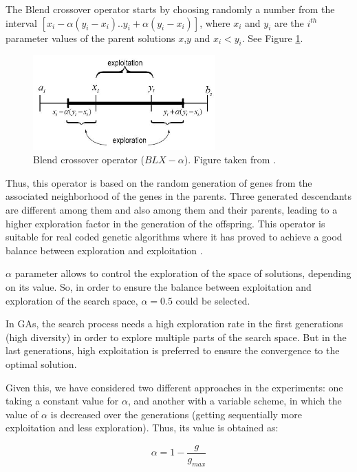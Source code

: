 \documentclass[10pt,journal,compsoc]{IEEEtran}
\begin{document}
The Blend crossover operator starts by choosing randomly a number from the interval $[x_i-\alpha(y_i-x_i).. y_i+\alpha(y_i-x_i)]$, where $x_i$ and $y_i$ are the $i^{th}$ parameter values of the parent solutions $x$,$y$ and $x_i < y_i$. See Figure \ref{fig:blxalpha}.

 \begin{figure}[!ht]	
 	\begin{center}
 		\includegraphics[width=7cm]{fig/blxalpha.jpg}
 		\caption{Blend crossover operator ($BLX-\alpha$). Figure taken from \cite{Adibo_BLXFig_03}.}
 		\label{fig:blxalpha}	
 	\end{center}	
 \end{figure}

Thus, this operator is based on the random generation of genes from the associated neighborhood of the genes in the parents. Three generated descendants are different among them and also among them and their parents, leading to a higher exploration factor in the generation of the offspring.
This operator is suitable for real coded genetic algorithms where it has proved to achieve a good balance between exploration and exploitation \cite{blx2008}.

$\alpha$ parameter allows to control the exploration of the space of solutions, depending on its value. So, in order to ensure the balance between exploitation and exploration of the search space, $\alpha = 0.5$ could be selected.

In GAs, the search process needs a high exploration rate in the first generations (high diversity) in order to explore multiple parts of the search space. But in the last generations, high exploitation is preferred to ensure the convergence to the optimal solution.

Given this, we have considered two different approaches in the experiments: one taking a constant value for $\alpha$, and another with a variable scheme, in which the value of $\alpha$ is decreased over the generations (getting sequentially more exploitation and less exploration). Thus, its value is obtained as:

 \begin{equation}
 	\label{eqalpha}
 	\alpha =1-\frac{g}{g_{max}}
 \end{equation}
\end{document}
